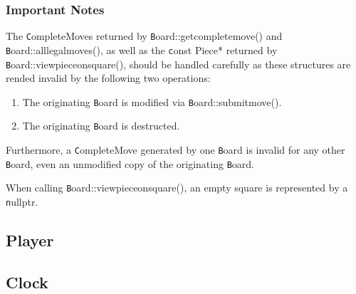 \documentclass[letter]{article}
\newcommand{\code}[1]{{\texttt #1}}
\renewcommand\_{\textunderscore\allowbreak}
\begin{document}
\subsubsection{Important Notes}
The \code{Complete\_Move}s returned by \code{Board::get\_complete\_move()} and \code{Board::all\_legal\_moves()}, as well as the \code{const Piece*} returned by \code{Board::view\_piece\_on\_square()}, should be handled carefully as these structures are rended invalid by the following two operations:
\begin{enumerate}
	\item The originating \code{Board} is modified via \code{Board::submit\_move()}.
	\item The originating \code{Board} is destructed.
\end{enumerate}
Furthermore, a \code{Complete\_Move} generated by one \code{Board} is invalid for any other \code{Board}, even an unmodified copy of the originating \code{Board}.

When calling \code{Board::view\_piece\_on\_square()}, an empty square is represented by a \code{nullptr}.

\subsection{Player}

\subsection{Clock}
\end{document}
